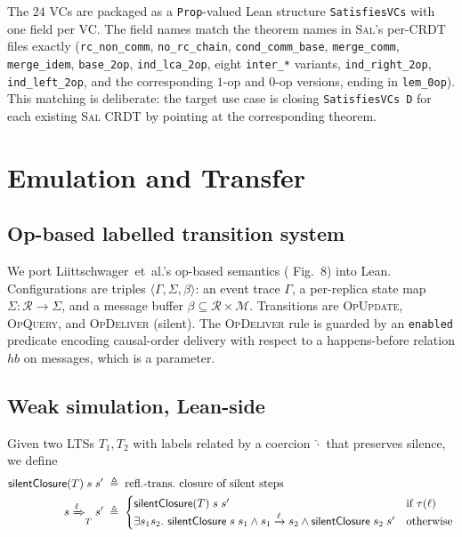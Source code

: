 \documentclass[11pt,a4paper]{article}
\theoremstyle{definition}
\theoremstyle{remark}
\newcommand{\State}{\Sigma}
\newcommand{\Replica}{\mathcal{R}}
\newcommand{\Msg}{\mathcal{M}}
\newcommand{\Sal}{\textsc{Sal}}
\begin{document}
The $24$ VCs are packaged as a \texttt{Prop}-valued Lean structure
\texttt{SatisfiesVCs} with one field per VC. The field names match
the theorem names in \Sal{}'s per-CRDT files exactly
(\texttt{rc\_non\_comm}, \texttt{no\_rc\_chain},
\texttt{cond\_comm\_base}, \texttt{merge\_comm}, \texttt{merge\_idem},
\texttt{base\_2op}, \texttt{ind\_lca\_2op}, eight \texttt{inter\_*}
variants, \texttt{ind\_right\_2op}, \texttt{ind\_left\_2op}, and the
corresponding $1$-op and $0$-op versions, ending in
\texttt{lem\_0op}). This matching is deliberate: the target use
case is closing \texttt{SatisfiesVCs D} for each existing \Sal{}
CRDT by pointing at the corresponding theorem.

\section{Emulation and Transfer}
\label{sec:emulation}

\subsection{Op-based labelled transition system}
\label{sec:op-ts}

We port Liittschwager~et~al.'s op-based semantics
(\cite{liittschwager2025} Fig.~8) into Lean. Configurations are
triples $\langle \Gamma, \Sigma, \beta\rangle$: an event trace
$\Gamma$, a per-replica state map $\Sigma : \Replica \to \State$,
and a message buffer $\beta \subseteq \Replica \times \Msg$.
Transitions are
\textsc{OpUpdate}, \textsc{OpQuery}, and \textsc{OpDeliver}
(silent). The \textsc{OpDeliver} rule is guarded by an
\texttt{enabled} predicate encoding causal-order delivery with
respect to a happens-before relation $\mathit{hb}$ on messages,
which is a parameter.

\subsection{Weak simulation, Lean-side}
\label{sec:weaksim}

Given two LTSs $T_1, T_2$ with labels related by a coercion
$\widehat{\cdot}$ that preserves silence, we define
\begin{align*}
  \mathsf{silentClosure}(T)\;s\;s' &\;\triangleq\; \text{refl.-trans.\ closure of silent steps}\\
  s \xRightarrow{\ell}_T s' &\;\triangleq\; \begin{cases}
    \mathsf{silentClosure}(T)\;s\;s' & \text{if } \tau(\ell)\\
    \exists s_1 s_2.\ \mathsf{silentClosure}\;s\;s_1 \wedge s_1 \xrightarrow{\ell} s_2 \wedge \mathsf{silentClosure}\;s_2\;s' & \text{otherwise}
  \end{cases}
\end{align*}
\end{document}
